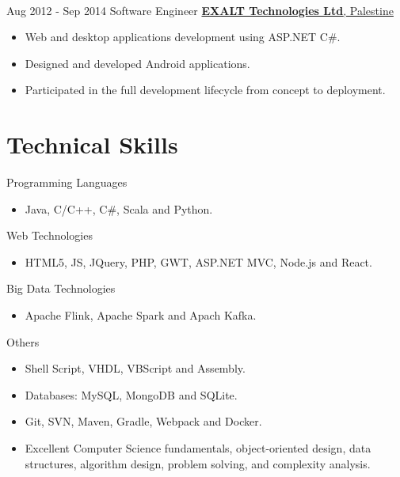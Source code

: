 \documentclass[letterpaper]{twentysecondcv} %
\begin{document}
\begin{twenty}
{{\begin{itemize}
        
    \end{itemize}}
        }
     \\
     \twentyitem
   		{Aug 2012 -}
		{Sep 2014}
        {Software Engineer}
        {\href{http://www.exalt-tech.com/about/}{\large\textbf{EXALT Technologies Ltd}, Palestine}}
        {}
        {
        \begin{itemize}
        \item Web and desktop applications development using ASP.NET C\#.
        \item Designed and developed Android applications. 
        \item Participated in the full development lifecycle from concept to deployment.
        
    \end{itemize}
    	}
        
\end{twenty}

\section{Technical  Skills}
\begin{twenty} %
	\twentyitem
	{}
	{}
	{Programming Languages}
	{}
	{}
	{ \begin{itemize}
			\item Java, C/C++, C\#, Scala and  Python.	\\	
	\end{itemize}}

	\twentyitem
{}
{}
{Web Technologies}
{}
{}
{ \begin{itemize}
		\item HTML5, JS, JQuery, PHP,  GWT, ASP.NET MVC,  Node.js and React.	\\	
\end{itemize}}

		\twentyitem
	{}
	{}
	{Big Data Technologies}
	{}
	{}
	{ \begin{itemize}
			\item Apache Flink,  Apache
			Spark and Apach Kafka.	\\	
	\end{itemize}}

		\twentyitem
{}
{}
{Others}
{}
{}
{ \begin{itemize}
		\item Shell Script, VHDL, VBScript and Assembly.	
		\item Databases: MySQL, MongoDB and SQLite.
		\item Git, SVN, Maven, Gradle, Webpack and Docker.
		\item Excellent Computer Science fundamentals, object-oriented design, data structures, algorithm design, problem solving, and complexity analysis.	
\end{itemize}}



\end{twenty}
\end{document}
